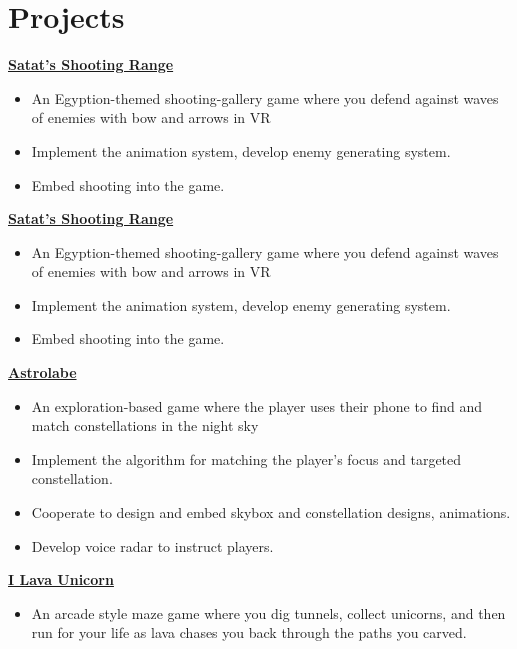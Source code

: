 \documentclass{article}
\begin{document}
{		\section{Projects}
		\vspace{5pt}
		\textbf{\href{http://www.plutoshe.com/blog/Satat'sShootingRange}{Satat's Shooting Range}} \hfill \quad
		
		\begin{itemize}
			\item An Egyption-themed shooting-gallery game where you defend against waves of enemies with bow and arrows in VR
			\item Implement the animation system, develop enemy generating system.
			\item Embed shooting into the game.
		\end{itemize}
	
		\textbf{\href{http://www.plutoshe.com/blog/Satat'sShootingRange}{Satat's Shooting Range}} \hfill \quad
		
		\begin{itemize}
			\item An Egyption-themed shooting-gallery game where you defend against waves of enemies with bow and arrows in VR
			\item Implement the animation system, develop enemy generating system.
			\item Embed shooting into the game.
		\end{itemize}
		
		
		\textbf{\href{http://www.plutoshe.com/blog/Astrolabe}{Astrolabe}} \hfill \quad
		
		\begin{itemize}
			\item An exploration-based game where the player uses their phone to find and match constellations in the night sky
			\item Implement the algorithm for matching the player's focus and targeted constellation.			
			\item Cooperate to design and embed skybox and constellation designs, animations.	
			\item Develop voice radar to instruct players.
			

		\end{itemize}
		
		
		
		\textbf{\href{http://www.plutoshe.com/blog/ILavaUnicorn}{I Lava Unicorn}} \hfill \quad
		
		\begin{itemize}
			\item An arcade style maze game where you dig tunnels, collect unicorns, and then run for your life as lava chases you back through the paths you carved.
			

\end{itemize}}
\end{document}

